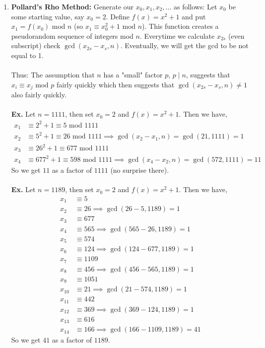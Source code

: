 \documentclass[class=article, crop=false]{standalone}
\begin{document}
\begin{enumerate}
	\item \textbf{Pollard's Rho Method:} 
	Generate our $x_0,x_1,x_2,\ldots$ as follows: Let $x_0$ be some starting value, say
	$x_0=2$. Define $f(x)=x^2+1$ and put $x_1=f(x_0)\mbox{ mod }n$ (so $x_1\equiv x_0^2+1\mbox{ mod }n$).
	This function creates a pseudorandom sequence of integers mod $n$.
	Everytime we calculate $x_{2s}$ (even subscript) check $\gcd(x_{2s}-x_s, n)$.
	Eventually, we will get the gcd to be not equal to 1. \\\\
	Thus: The assumption that $n$ has a "small" factor $p$, $p\mid n$,
	suggests that $x_i\equiv x_j\mbox{ mod }p$ fairly quickly
	which then suggests that $\gcd(x_{2s}-x_s,n)\neq1$ also
	fairly quickly. \\\\
	\textbf{Ex.} Let $n=1111$, then set $x_0=2$ and $f(x)=x^2+1$. Then we have,
	\begin{align*}
		x_1&\equiv 2^2+1\equiv 5\mbox{ mod }1111 \\
		x_2&\equiv 5^2+1\equiv 26\mbox{ mod }1111 \implies \gcd(x_2-x_1,n)=\gcd(21,1111)=1 \\
		x_3&\equiv 26^2+1\equiv 677\mbox{ mod }1111 \\
		x_4&\equiv 677^2+1\equiv 598\mbox{ mod }1111 \implies \gcd(x_4-x_2,n)=\gcd(572,1111)=11
	\end{align*}
	So we get $11$ as a factor of $1111$ (no surprise there). \\\\
	\textbf{Ex.} Let $n=1189$, then set $x_0=2$ and $f(x)=x^2+1$. Then we have,
	\begin{align*}
		x_1&\equiv 5 \\
		x_2&\equiv 26 \implies \gcd(26-5, 1189)=1\\
		x_3&\equiv 677 \\
		x_4&\equiv 565 \implies \gcd(565-26, 1189)=1\\
		x_5&\equiv 574 \\
		x_6&\equiv 124 \implies \gcd(124-677,1189)=1\\
		x_7&\equiv 1109 \\
		x_8&\equiv 456 \implies \gcd(456-565,1189)=1\\
		x_9&\equiv 1051 \\
		x_{10}&\equiv 21 \implies \gcd(21-574,1189)=1\\
		x_{11}&\equiv 442 \\
		x_{12}&\equiv 369 \implies \gcd(369-124, 1189)=1\\
		x_{13}&\equiv 616 \\
		x_{14}&\equiv 166 \implies \gcd(166-1109, 1189)=41
	\end{align*}
	So we get $41$ as a factor of $1189$.
\end{enumerate}
\end{document}
